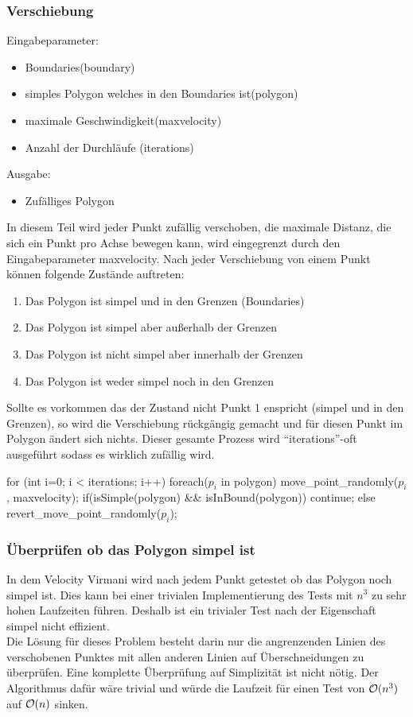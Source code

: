 	\subsubsection{Verschiebung}
		Eingabeparameter: 
		\begin{itemize}
			\item Boundaries(boundary)
			\item simples Polygon welches in den Boundaries ist(polygon)
			\item maximale Geschwindigkeit(maxvelocity)
			\item Anzahl der Durchläufe (iterations)
		\end{itemize}
		Ausgabe:
		\begin{itemize}
			\item Zufälliges Polygon
		\end{itemize}
		In diesem Teil wird jeder Punkt zufällig verschoben, die maximale 
		Distanz, die sich ein Punkt pro Achse bewegen kann, wird eingegrenzt 
		durch den Eingabeparameter maxvelocity. Nach jeder Verschiebung von 
		einem Punkt können folgende Zustände auftreten:
		\begin{enumerate}
			\item Das Polygon ist simpel und in den Grenzen (Boundaries)
			\item Das Polygon ist simpel aber außerhalb der Grenzen
			\item Das Polygon ist nicht simpel aber innerhalb der Grenzen
			\item Das Polygon ist weder simpel noch in den Grenzen
		\end{enumerate}
		Sollte es vorkommen das der Zustand nicht Punkt 1 enspricht (simpel 
		und in den Grenzen), so wird die Verschiebung rückgängig gemacht und 
		für diesen Punkt im Polygon ändert sich nichts.
		Dieser gesamte Prozess wird \enquote{iterations}-oft ausgeführt sodass 
		es wirklich zufällig wird.

		\begin{code}[caption={Pseudocode},mathescape=true]
		for (int i=0; i < iterations; i++)
		{
			foreach($p_i$ in polygon)
			{
				move_point_randomly($p_i$, maxvelocity);
				if(isSimple(polygon) && isInBound(polygon))
					continue;
				else
					revert_move_point_randomly($p_i$);
			}
		}
		\end{code}

	\subsubsection{Überprüfen ob das Polygon simpel ist}
		In dem Velocity Virmani wird nach jedem Punkt getestet ob das Polygon 
		noch simpel ist. Dies kann bei einer trivialen Implementierung des 
		Tests mit $n^3$ zu sehr hohen Laufzeiten führen.
		Deshalb ist ein trivialer Test nach der Eigenschaft simpel nicht 
		effizient.\smallskip \\ 
		Die Lösung für dieses Problem besteht darin nur die angrenzenden 
		Linien des verschobenen Punktes mit allen anderen Linien auf 
		Überschneidungen zu überprüfen. Eine komplette Überprüfung auf 
		Simplizität ist nicht nötig.
		Der Algorithmus dafür wäre trivial und würde die Laufzeit für einen 
		Test von $\mathcal{O}(n^3)$ auf $\mathcal{O}(n)$ sinken.

